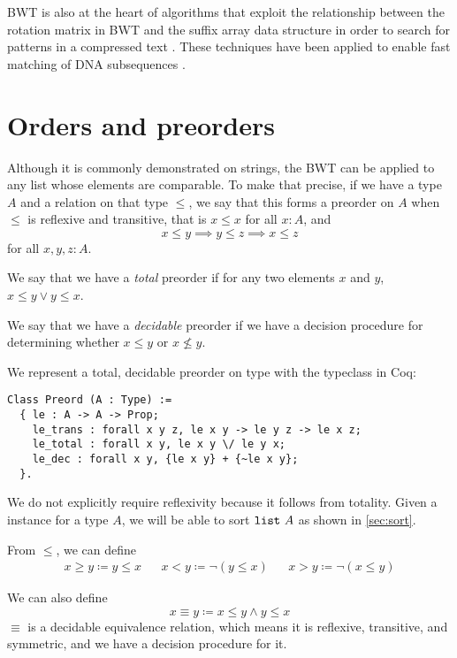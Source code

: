 \documentclass[sigplan,10pt,anonymous,review]{thesis}
\begin{document}
BWT is also at the heart of algorithms that exploit the relationship
between the rotation matrix in BWT and the suffix array data structure
in order to search for patterns in a compressed text
\cite{ferragina_index}. These techniques have been applied to enable
fast matching of DNA subsequences \cite{dna}.

\section{Orders and preorders}
\label{sec:ord}

Although it is commonly demonstrated on strings, the BWT can be
applied to any list whose elements are comparable. To make that
precise, if we have a type $A$ and a relation on that type $\le$, we say
that this forms a preorder on $A$ when $\le$ is reflexive and transitive, that is
$x \le x$ for all $x:A$, and
\begin{equation*}
  x \le y \implies y \le z \implies x \le z
\end{equation*}
for all $x,y,z:A$.

We say that we have a \textit{total} preorder if for any two elements
$x$ and $y$, $x \le y \lor y \le x$.

We say that we have a \textit{decidable} preorder if we have a
decision procedure for determining whether $x \le y$ or $x \not\le y$.

We represent a total, decidable preorder on type with the
 typeclass in Coq:
\begin{lstlisting}
Class Preord (A : Type) :=
  { le : A -> A -> Prop;
    le_trans : forall x y z, le x y -> le y z -> le x z;
    le_total : forall x y, le x y \/ le y x;
    le_dec : forall x y, {le x y} + {~le x y};
  }.
\end{lstlisting}
We do not explicitly require reflexivity because it follows from
totality. Given a  instance for a type $A$, we will be
able to sort $\texttt{\textup{list}}~A$ as shown in \cref{sec:sort}.

From $\le$, we can define
\begin{align*}
x \ge y \coloneqq y \le x && x < y \coloneqq \lnot (y \le x) && x > y \coloneqq \lnot (x \le y)
\end{align*}

We can also define
\begin{equation*}
  x \equiv y \coloneqq x \le y \land y \le x
\end{equation*}
$\equiv$ is a
decidable equivalence relation, which means it is reflexive,
transitive, and symmetric, and we have a decision procedure for it.
\end{document}
